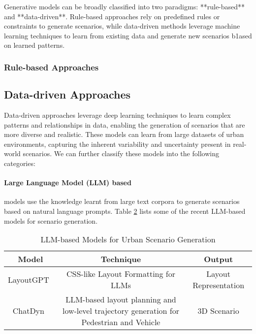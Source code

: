 \documentclass{article}
\begin{document}
\begin{table}[ht]
Generative models can be broadly classified into two paradigms: **rule-based** and **data-driven**. Rule-based approaches rely on predefined rules or constraints to generate scenarios, while data-driven methods leverage machine learning techniques to learn from existing data and generate new scenarios b1ased on learned patterns.

\subsubsection{Rule-based Approaches}

\subsection{Data-driven Approaches}

Data-driven  approaches leverage deep learning techniques to learn complex patterns and relationships in data, enabling the generation of scenarios that are more diverse and realistic. These models can learn from large datasets of urban environments, capturing the inherent variability and uncertainty present in real-world scenarios. We can further classify these models into the following categories:

\paragraph{Large Language Model (LLM) based} models use the knowledge learnt from large text corpora to generate scenarios based on natural language prompts. Table \ref{tab:llm_based_models} lists some of the recent LLM-based models for scenario generation.

\begin{table}[ht]
    \centering
    \begin{tabular}{|c|c|c|}
        \hline
        \textbf{Model} & \textbf{Technique} & \textbf{Output} \\ \hline        
        LayoutGPT~\cite{feng2023layoutgpt} & CSS-like Layout Formatting for LLMs & Layout Representation \\ \hline
        ChatDyn~\cite{wei2024chatdyn} & LLM-based layout planning and low-level trajectory generation for Pedestrian and Vehicle & 3D Scenario \\ 

    \end{tabular}
    \caption{LLM-based Models for Urban Scenario Generation}
    \label{tab:llm_based_models}
\end{table}


\end{table}
\end{document}

